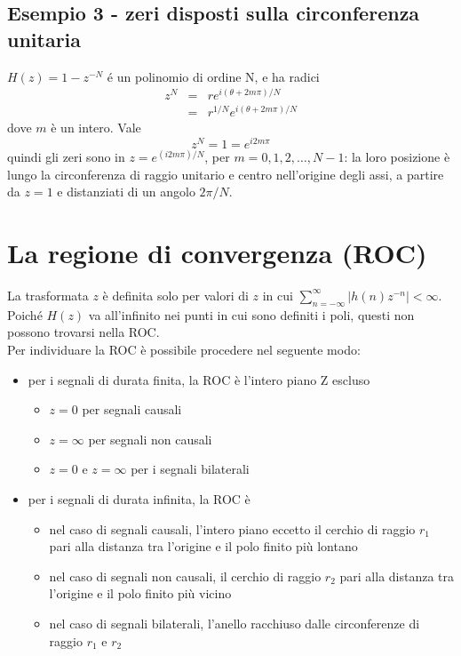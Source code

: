 \subsection*{Esempio 3 - zeri disposti sulla circonferenza unitaria}
$H(z)=1-z^{-N}$ \'e un polinomio di ordine N, e ha radici 
\begin{eqnarray*}
z^N & = & re^{i(\theta+2m \pi)/N} \\
    & = & r^{1/N}e^{i(\theta + 2m\pi)/N}
\end{eqnarray*}
dove $m$ \`e un intero.
Vale
\begin{displaymath}
z^N=1=e^{i2m\pi}
\end{displaymath} 
quindi gli zeri sono in $z=e^{(i2m\pi)/N}$, per $m=0, 1, 2, \ldots, N-1$: la loro posizione \`e lungo la circonferenza di raggio unitario e centro nell'origine degli assi, a partire da $z=1$ e distanziati di un angolo $2\pi/N$.
\section{La regione di convergenza (ROC)}
La trasformata $z$ \`e definita solo per valori di $z$ in cui $\sum_{n=-\infty}^\infty |h(n)z^{-n}|<\infty$. \\
Poich\'e $H(z)$ va all'infinito nei punti in cui sono definiti i poli, questi non possono trovarsi nella ROC. \\
Per individuare la ROC \`e possibile procedere nel seguente modo:
\begin{itemize}
\item per i segnali di durata finita, la ROC \`e l'intero piano Z escluso 
\begin{itemize}
\item $z=0$ per segnali causali
\item $z=\infty$ per segnali non causali
\item $z=0$ e  $z=\infty$ per i segnali bilaterali
\end{itemize}
\item per i segnali di durata infinita, la ROC \`e
\begin{itemize}
\item nel caso di segnali causali, l'intero piano eccetto il cerchio di raggio $r_1$ pari alla distanza tra l'origine e il polo finito pi\`u lontano
\item nel caso di segnali non causali, il cerchio di raggio $r_2$ pari alla distanza tra l'origine e il polo finito pi\`u vicino
\item nel caso di segnali bilaterali, l'anello racchiuso dalle circonferenze di raggio $r_1$ e $r_2$
\end{itemize}
\end{itemize}

